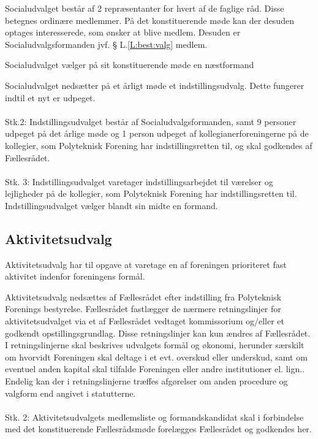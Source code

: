 \begin{list}
\item Socialudvalget består af 2 repræsentanter for hvert af de faglige råd. Disse betegnes ordinære medlemmer. På det konstituerende møde kan der desuden optages interesserede, som ønsker at blive medlem. Desuden er Socialudvalgsformanden jvf. § L.\ref{L:best:valg} medlem.

\item Socialudvalget vælger på sit konstituerende møde en næstformand

\item Socialudvalget nedsætter på et årligt møde et indstillingsudvalg. Dette fungerer indtil et nyt er udpeget.
\\
\\
Stk.2: Indstillingsudvalget består af Socialudvalgsformanden, samt 9 personer udpeget på det årlige møde og 1 person udpeget af kollegianerforeningerne på de kollegier, som Polyteknisk Forening har indstillingsretten til, og skal godkendes af Fællesrådet.
\\
\\
Stk. 3: Indstillingsudvalget varetager indstillingsarbejdet til værelser og lejligheder på de kollegier, som Polyteknisk Forening har indstillingsretten til. Indstillingsudvalget vælger blandt sin midte en formand.




\subsection{Aktivitetsudvalg}
\item Aktivitetsudvalg har til opgave at varetage en af foreningen prioriteret fast aktivitet indenfor foreningens formål.

\item Aktivitetsudvalg nedsættes af Fællesrådet efter indstilling fra Polyteknisk Forenings bestyrelse. Fællesrådet fastlægger de nærmere retningslinjer for aktivitetsudvalget via et af Fællesrådet vedtaget kommissorium og/eller et godkendt opstillingsgrundlag. Disse retningslinjer kan kun ændres af Fællesrådet. I retningslinjerne skal beskrives udvalgets formål og økonomi, herunder særskilt om hvorvidt Foreningen skal deltage i et evt. overskud eller underskud, samt om eventuel anden kapital skal tilfalde Foreningen eller andre institutioner el. lign.. Endelig kan der i retningslinjerne træffes afgørelser om anden procedure og valgform end angivet i statutterne.
\\
\\
Stk. 2: Aktivitetsudvalgets medlemsliste og formandskandidat skal i forbindelse med det konstituerende Fællesrådsmøde forelægges Fællesrådet og godkendes her.


\end{list}
